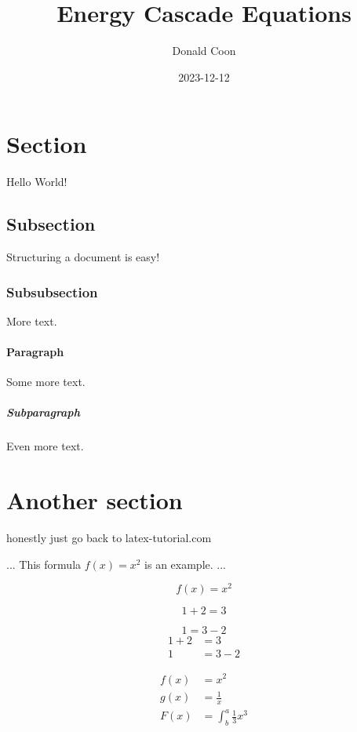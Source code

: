 \documentclass{article}
\title{Energy Cascade Equations}
\date{2023-12-12}
\author{Donald  Coon}
\begin{document}
\maketitle
{}
\newpage
\tableofcontents
\newpage
{}

\section{Section}
Hello World!
\subsection{Subsection}
Structuring a document is easy!
\subsubsection{Subsubsection}
More text.
\paragraph{Paragraph}
Some more text.
\subparagraph{Subparagraph}
Even more text.
\section{Another section}

honestly just go back to latex-tutorial.com

...
This formula $f(x) = x^2$ is an example.
...

\begin{equation*}
  f(x) = x^2
\end{equation*}

\begin{equation*}
1+2 =3
\end{equation*}

\begin{equation*}
  1 = 3 - 2
\end{equation*}
\begin{align*}
  1 + 2 &= 3\\
  1 &= 3 - 2
\end{align*}

\begin{align*}
  f(x) &= x^2\\
  g(x) &= \frac{1}{x}\\
  F(x) &= \int^a_b \frac{1}{3}x^3
\end{align*}
\end{document}
